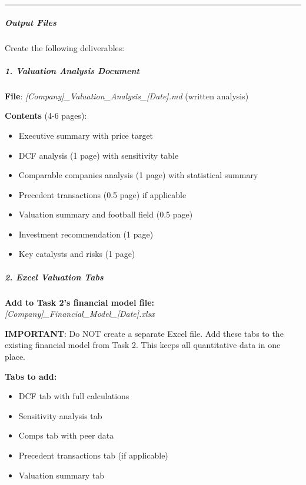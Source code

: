\documentclass[11pt]{article}
\begin{document}
\vspace{0.5em}\hrule\vspace{0.5em}

\subparagraph{Output Files}\mbox{}\par

Create the following deliverables:


\subparagraph{1. Valuation Analysis Document}\mbox{}\par
\textbf{File}: \emph{[Company]\_\allowbreak{}Valuation\_\allowbreak{}Analysis\_\allowbreak{}[Date].md} (written analysis)


\textbf{Contents} (4-6 pages):

\begin{itemize}[leftmargin=*,itemsep=2pt,topsep=2pt]
\item {} Executive summary with price target
\item {} DCF analysis (1 page) with sensitivity table
\item {} Comparable companies analysis (1 page) with statistical summary
\item {} Precedent transactions (0.5 page) if applicable
\item {} Valuation summary and football field (0.5 page)
\item {} Investment recommendation (1 page)
\item {} Key catalysts and risks (1 page)
\end{itemize}

\subparagraph{2. Excel Valuation Tabs}\mbox{}\par
\textbf{Add to Task 2's financial model file:} \emph{[Company]\_\allowbreak{}Financial\_\allowbreak{}Model\_\allowbreak{}[Date].xlsx}


\textbf{IMPORTANT}: Do NOT create a separate Excel file. Add these tabs to the existing financial model from Task 2. This keeps all quantitative data in one place.


\textbf{Tabs to add:}

\begin{itemize}[leftmargin=*,itemsep=2pt,topsep=2pt]
\item {} DCF tab with full calculations
\item {} Sensitivity analysis tab
\item {} Comps tab with peer data
\item {} Precedent transactions tab (if applicable)
\item {} Valuation summary tab
\end{itemize}
\end{document}
